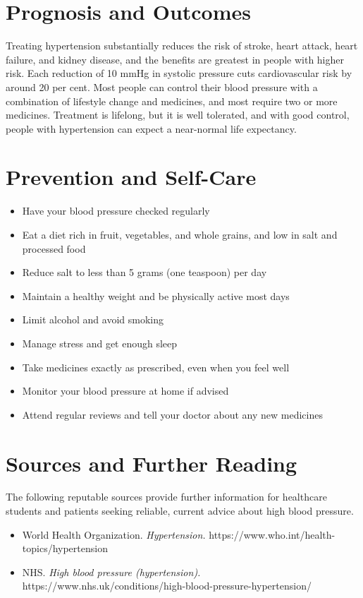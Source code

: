 \section*{Prognosis and Outcomes}
Treating hypertension substantially reduces the risk of stroke, heart attack, heart failure, and kidney disease, and the benefits are greatest in people with higher risk. Each reduction of 10 mmHg in systolic pressure cuts cardiovascular risk by around 20 per cent. Most people can control their blood pressure with a combination of lifestyle change and medicines, and most require two or more medicines. Treatment is lifelong, but it is well tolerated, and with good control, people with hypertension can expect a near-normal life expectancy.

\section*{Prevention and Self-Care}
\begin{itemize}
    \item Have your blood pressure checked regularly
    \item Eat a diet rich in fruit, vegetables, and whole grains, and low in salt and processed food
    \item Reduce salt to less than 5 grams (one teaspoon) per day
    \item Maintain a healthy weight and be physically active most days
    \item Limit alcohol and avoid smoking
    \item Manage stress and get enough sleep
    \item Take medicines exactly as prescribed, even when you feel well
    \item Monitor your blood pressure at home if advised
    \item Attend regular reviews and tell your doctor about any new medicines
\end{itemize}

\section*{Sources and Further Reading}
The following reputable sources provide further information for healthcare students and patients seeking reliable, current advice about high blood pressure.
\begin{itemize}
    \item World Health Organization. \textit{Hypertension.} https://www.who.int/health-topics/hypertension
    \item NHS. \textit{High blood pressure (hypertension).} https://www.nhs.uk/conditions/high-blood-pressure-hypertension/
\end{itemize}
